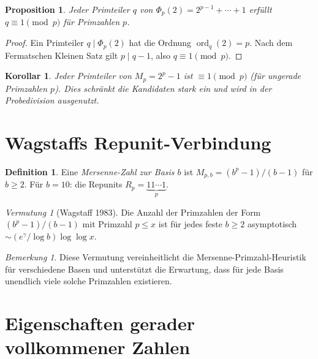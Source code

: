 \documentclass[12pt,a4paper]{amsart}
\newtheorem{proposition}[theorem]{Proposition}
\newtheorem{korollar}[theorem]{Korollar}
\theoremstyle{definition}
\newtheorem{definition_de}[theorem]{Definition}
\theoremstyle{remark}
\newtheorem{bemerkung}[theorem]{Bemerkung}
\newtheorem{vermutung}[theorem]{Vermutung}
\DeclareMathOperator{\ord}{ord}
\begin{document}
\begin{proposition}
Jeder Primteiler $q$ von $\Phi_p(2) = 2^{p-1} + \cdots + 1$ erfüllt
$q \equiv 1 \pmod{p}$ für Primzahlen $p$.
\end{proposition}

\begin{proof}
Ein Primteiler $q \mid \Phi_p(2)$ hat die Ordnung $\ord_q(2) = p$.
Nach dem Fermatschen Kleinen Satz gilt $p \mid q-1$, also $q \equiv 1 \pmod{p}$.
\end{proof}

\begin{korollar}
Jeder Primteiler von $M_p = 2^p - 1$ ist $\equiv 1 \pmod{p}$
(für ungerade Primzahlen $p$).
Dies schränkt die Kandidaten stark ein und wird in der Probedivision ausgenutzt.
\end{korollar}

\section{Wagstaffs Repunit-Verbindung}

\begin{definition_de}
Eine \emph{Mersenne-Zahl zur Basis $b$} ist $M_{p,b} = (b^p - 1)/(b - 1)$
für $b \geq 2$.
Für $b = 10$: die Repunits $R_p = \underbrace{11\cdots1}_p$.
\end{definition_de}

\begin{vermutung}[Wagstaff 1983]
Die Anzahl der Primzahlen der Form $(b^p - 1)/(b-1)$ mit Primzahl $p \leq x$
ist für jedes feste $b \geq 2$ asymptotisch $\sim (e^\gamma / \log b) \log\log x$.
\end{vermutung}

\begin{bemerkung}
Diese Vermutung vereinheitlicht die Mersenne-Primzahl-Heuristik für verschiedene
Basen und unterstützt die Erwartung, dass für jede Basis unendlich viele solche
Primzahlen existieren.
\end{bemerkung}

\section{Eigenschaften gerader vollkommener Zahlen}
\end{document}
